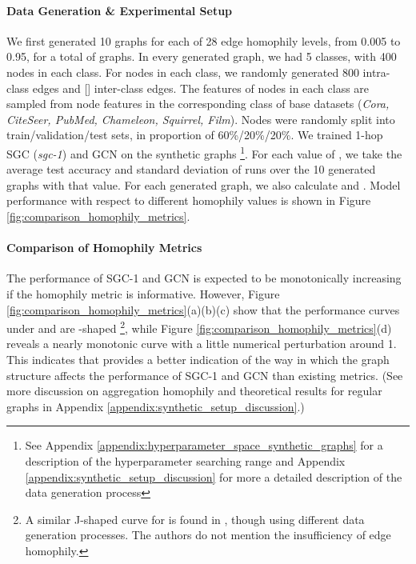 \documentclass{article}
\newcommand{\0}{{\boldsymbol{0}}}
\newcommand{\6}{{\partial}}
\newcommand{\8}{{\infty}}
\newcommand{\4}{{\nabla}}
\begin{document}
\paragraph{Data Generation \& Experimental Setup}
We first generated 10 graphs for each of 28 edge homophily levels, from 0.005 to 0.95, for a total of  graphs. In every generated graph, we had 5 classes, with 400 nodes in each class. For nodes in each class, we randomly generated 800 intra-class edges and [] inter-class edges. The features of nodes in each class are sampled from node features in the corresponding class of  base datasets (\textit{Cora, CiteSeer, PubMed, Chameleon, Squirrel, Film}). Nodes were randomly split into  train/validation/test sets, in proportion of 60\%/20\%/20\%. We trained 1-hop SGC (\textit{sgc-1}) \cite{wu2019simplifying} and GCN \cite{kipf2016classification} on the synthetic graphs \footnote{See Appendix \ref{appendix:hyperparameter_space_synthetic_graphs} for a description of the hyperparameter searching range and Appendix \ref{appendix:synthetic_setup_discussion} for more a detailed description of the data generation process}. For each value of , we take the average test accuracy and standard deviation of runs over the 10 generated graphs with that value. For each generated graph, we also calculate  and . Model performance with respect to different homophily values is shown in Figure \ref{fig:comparison_homophily_metrics}.
\vspace{-0.2cm}
\paragraph{Comparison of Homophily Metrics}
The performance of SGC-1 and GCN is expected to be monotonically increasing if the homophily metric is informative. However, Figure \ref{fig:comparison_homophily_metrics}(a)(b)(c) show that the performance curves under  and  are -shaped \footnote{A similar J-shaped curve for  is found in \cite{zhu2020beyond}, though using different data generation processes. The authors do not mention the insufficiency of edge homophily.}, while Figure \ref{fig:comparison_homophily_metrics}(d) reveals a nearly monotonic curve with a little numerical perturbation around 1. This indicates that  provides a better indication of the way in which the graph structure affects the performance of SGC-1 and GCN than existing metrics. (See more discussion on aggregation homophily and theoretical results for regular graphs in Appendix \ref{appendix:synthetic_setup_discussion}.)
\end{document}
